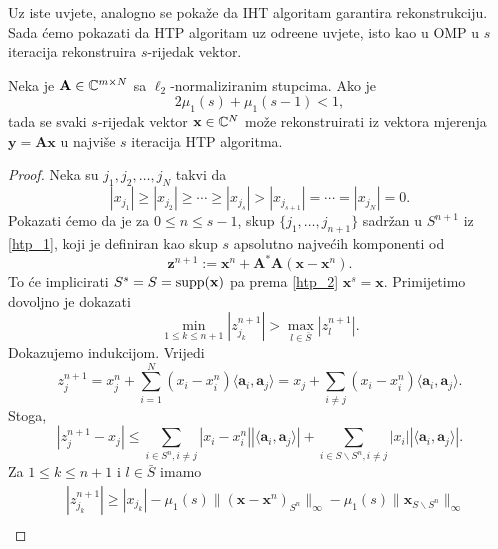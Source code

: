 \documentclass[a4paper,twoside,12pt]{memoir} %
\newcommand{\vect}[1]{\mathbf{#1}}
\renewcommand{\vec}{\vect}
\newcommand{\supp}{\text{\normalfont{supp}}}
\newcommand{\norm}[1]{\|{#1}\|}
\begin{document}
Uz iste uvjete, analogno se poka\v{z}e da IHT algoritam garantira rekonstrukciju. Sada \'cemo pokazati da HTP algoritam uz odre\dj ene uvjete, isto kao u OMP u $s$ iteracija rekonstruira $s$-rijedak vektor.
\begin{thm}\label{tm:5:17}
    Neka je $\vec A \in \C^{m \times N}$ sa $\ell_2$-normaliziranim stupcima. Ako je
    \begin{equation*}
        2 \mu_1(s) + \mu_1(s-1) < 1, 
    \end{equation*}
    tada se svaki $s$-rijedak vektor $\vec x \in \C^N$ mo\v{z}e rekonstruirati iz vektora mjerenja $ \vec y = \vec{Ax}$ u najvi\v{s}e $s$ iteracija HTP algoritma.
\end{thm}
\begin{proof}
    Neka su $j_1, j_2, \dots, j_N$ takvi da
    \begin{equation*}
        |x_{j_1}| \geq |x_{j_2}| \geq \cdots \geq |x_{j_s}| > |x_{j_{s+1}}| = \cdots = |x_{j_N}| = 0.
    \end{equation*}
    Pokazati \'cemo da je za $0 \leq n \leq s - 1$, skup $\{j_1, \dots, j_{n+1}\}$ sadr\v{z}an u $S^{n+1}$ iz \eqref{htp_1}, koji je definiran kao skup $s$ apsolutno najve\'cih komponenti od 
    \begin{equation}\label{5:18}
        \vec z^{n+1} := \vec x^n + \vec A^* \vec A(\vec x - \vec x^n). 
    \end{equation}
    To \'ce implicirati $S^s = S = \supp(\vec x)$ pa prema \eqref{htp_2} $\vec x^s = \vec x$. Primijetimo dovoljno je dokazati
    \begin{equation}\label{5:19}
        \min_{1 \leq k \leq n+1} |z_{j_k}^{n+1}| > \max_{l \in \bar S}|z_{l}^{n+1}|.
    \end{equation}
    Dokazujemo indukcijom. Vrijedi
    \begin{equation*}
        z_j^{n+1} = x_j^n + \sum_{i = 1}^N (x_i - x_i^n) \langle \vec a_i, \vec a_j \rangle = x_j + \sum_{i \neq j}(x_i - x_i^n) \langle \vec a_i, \vec a_j \rangle.
    \end{equation*}
    Stoga,
    \begin{equation}\label{5:20}
        |z_j^{n+1} - x_j| \leq \sum_{i \in S^n, i \neq j} |x_i - x_i^n|| \langle \vec a_i, \vec a_j \rangle| + \sum_{i \in S \backslash S^n, i \neq j} |x_i||\langle \vec a_i, \vec a_j \rangle|.
    \end{equation}
    Za $1 \leq k \leq n + 1$ i $l \in \bar S$ imamo
    \begin{align} 
        &|z_{j_k}^{n+1}| \geq |x_{j_k}| - \mu_1(s)\norm{ ( \vec x - \vec x^n )_{S^n} }_{\infty } - \mu_1(s) \norm{\vec x_{S \backslash S^n}}_{\infty} \label{5:21} \\[1em]

\end{align}
\end{proof}
\end{document}
